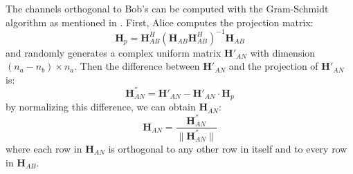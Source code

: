 The channels orthogonal to Bob's can be computed with the Gram-Schmidt algorithm as mentioned in \cite{anand2012strobe,schulz2014practical,zheng2016profiling}. First, Alice computes the projection matrix:
\begin{equation}
    \mathbf{H}_p = \mathbf{H}_{AB}^H(\mathbf{H}_{AB}\mathbf{H}_{AB}^H)^{-1}\mathbf{H}_{AB}
\end{equation}
and randomly generates a complex uniform matrix $\mathbf{H}'_{AN}$ with dimension $(n_{a}-n_{b}) \times n_{a}$. Then the difference between $\mathbf{H}'_{AN}$ and the projection of $\mathbf{H}'_{AN}$ is:
\begin{equation}
    \mathbf{H}^{''}_{AN} = \mathbf{H}'_{AN}-\mathbf{H}'_{AN} \cdot \mathbf{H}_p
\end{equation}
by normalizing this difference, we can obtain $\mathbf{H}_{AN}$:
\begin{equation}
    \mathbf{H}_{AN} = \frac{\mathbf{H}^{''}_{AN}}{\| \mathbf{H}^{''}_{AN} \|}
\end{equation}
where each row in $\mathbf{H}_{AN}$ is orthogonal to any other row in itself and to every row in $\mathbf{H}_{AB}$.

